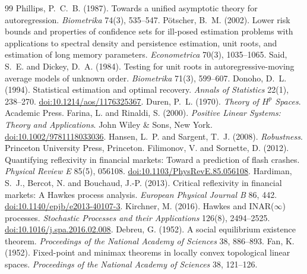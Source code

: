 \begin{thebibliography}{99}
 Phillips, P.~C.~B. (1987). Towards a unified asymptotic theory for autoregression. \emph{Biometrika} 74(3), 535--547.
 P\"otscher, B.~M. (2002). Lower risk bounds and properties of confidence sets for ill-posed estimation problems with applications to spectral density and persistence estimation, unit roots, and estimation of long memory parameters. \emph{Econometrica} 70(3), 1035--1065.
 Said, S.~E. and Dickey, D.~A. (1984). Testing for unit roots in autoregressive-moving average models of unknown order. \emph{Biometrika} 71(3), 599--607.
 Donoho, D.~L. (1994). Statistical estimation and optimal recovery. \emph{Annals of Statistics} 22(1), 238--270. \href{https://doi.org/10.1214/aos/1176325367}{doi:10.1214/aos/1176325367}.
 Duren, P.~L. (1970). \emph{Theory of $H^p$ Spaces}. Academic Press.
 Farina, L. and Rinaldi, S. (2000). \emph{Positive Linear Systems: Theory and Applications}. John Wiley \& Sons, New York. \href{https://doi.org/10.1002/9781118033036}{doi:10.1002/9781118033036}.
 Hansen, L.~P. and Sargent, T.~J. (2008). \emph{Robustness}. Princeton University Press, Princeton.
 Filimonov, V. and Sornette, D. (2012). Quantifying reflexivity in financial markets: Toward a prediction of flash crashes. \emph{Physical Review E} 85(5), 056108. \href{https://doi.org/10.1103/PhysRevE.85.056108}{doi:10.1103/PhysRevE.85.056108}.
 Hardiman, S.~J., Bercot, N. and Bouchaud, J.-P. (2013). Critical reflexivity in financial markets: A Hawkes process analysis. \emph{European Physical Journal B} 86, 442. \href{https://doi.org/10.1140/epjb/e2013-40107-3}{doi:10.1140/epjb/e2013-40107-3}.
 Kirchner, M. (2016). Hawkes and INAR($\infty$) processes. \emph{Stochastic Processes and their Applications} 126(8), 2494--2525. \href{https://doi.org/10.1016/j.spa.2016.02.008}{doi:10.1016/j.spa.2016.02.008}.
 Debreu, G. (1952). A social equilibrium existence theorem. \emph{Proceedings of the National Academy of Sciences} 38, 886--893.
 Fan, K. (1952). Fixed-point and minimax theorems in locally convex topological linear spaces. \emph{Proceedings of the National Academy of Sciences} 38, 121--126.

\end{thebibliography}
